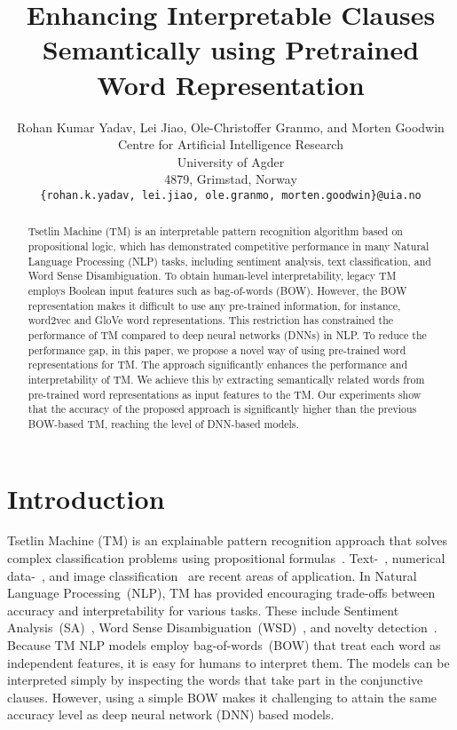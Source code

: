 \documentclass[11pt]{article}
\title{Enhancing Interpretable Clauses Semantically using Pretrained Word Representation}
\author{Rohan Kumar Yadav, Lei Jiao, Ole-Christoffer Granmo, and Morten Goodwin \\
  Centre for Artificial Intelligence Research \\ University of Agder \\
  4879, Grimstad, Norway \\

  \texttt{\{rohan.k.yadav, lei.jiao, ole.granmo, morten.goodwin\}@uia.no} \\}
\begin{document}
\maketitle

\begin{abstract}
Tsetlin Machine (TM) is an interpretable pattern recognition algorithm based on propositional logic, which has demonstrated competitive performance in many Natural Language Processing (NLP) tasks, including sentiment analysis, text classification, and Word Sense Disambiguation.  To obtain human-level interpretability, legacy TM employs Boolean input features such as bag-of-words (BOW). However, the BOW  representation makes it difficult to use any pre-trained information, for instance, word2vec and GloVe word representations. This restriction has constrained the performance of TM compared to deep neural networks (DNNs) in NLP. To reduce the performance gap, in this paper, we propose a novel way of using pre-trained word representations for TM. The approach significantly enhances the performance and interpretability of TM. We achieve this by extracting semantically related words from pre-trained word representations as input features to the TM. Our experiments show that the accuracy of the proposed approach is significantly higher than the previous BOW-based TM, reaching the level of DNN-based models.

\end{abstract}




\section{Introduction}
Tsetlin Machine (TM) is an explainable pattern recognition approach that solves complex classification problems using propositional formulas~\cite{Granmo2018TheTM}. Text-~\cite{Berge2019UsingTT}, numerical data-~\cite{10.1007/978-3-030-22999-3_49}, and image classification~\cite{granmo2019convolutional} are recent areas of application.  In Natural Language Processing~(NLP), TM has provided encouraging trade-offs between accuracy and interpretability for various tasks. These include Sentiment Analysis~(SA)~\cite{yadav2021sentiment,rupsa2020sentiment}, Word Sense Disambiguation~(WSD)~\cite{icaart21rohan}, and novelty detection~\cite{icaart21bimal}. Because TM NLP models employ bag-of-words~(BOW) that treat each word as independent features, it is easy for humans to interpret them. The models can be interpreted simply by inspecting the words that take part in the conjunctive clauses. However, using a simple BOW makes it challenging to attain the same accuracy level as deep neural network (DNN) based models.
\end{document}
